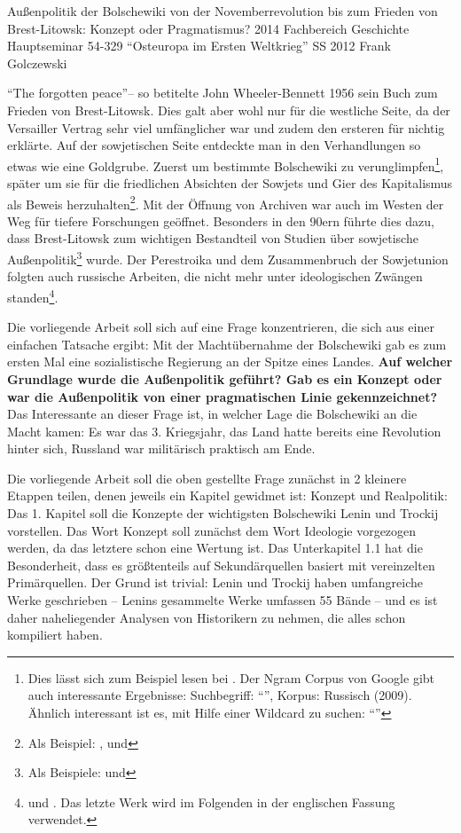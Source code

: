 \documentclass{../../sem_paper}
\begin{document}
\titlepg
{Außenpolitik der Bolschewiki von der Novemberrevolution bis zum Frieden von Brest-Litowsk: Konzept oder Pragmatismus?}
{2014}
{Fachbereich Geschichte}
{Hauptseminar 54-329 "`Osteuropa im Ersten Weltkrieg"'}
{SS 2012}
{Frank Golczewski}

\tocpaper

"`The forgotten peace"'-- so betitelte John Wheeler-Bennett 1956\autocite{wheeler1956} sein Buch zum Frieden von Brest-Litowsk. Dies galt aber wohl nur für die westliche Seite, da der Versailler Vertrag sehr viel umfänglicher war und zudem den ersteren für nichtig erklärte. Auf der sowjetischen Seite entdeckte man in den Verhandlungen so etwas wie eine Goldgrube. Zuerst um bestimmte Bolschewiki zu verunglimpfen\footnote{Dies lässt sich zum Beispiel lesen bei . Der Ngram Corpus von Google gibt auch interessante Ergebnisse: Suchbegriff: "`"', Korpus: Russisch (2009). Ähnlich interessant ist es, mit Hilfe einer Wildcard zu suchen: "`"'}, später um sie für die friedlichen Absichten der Sowjets und Gier des Kapitalismus als Beweis herzuhalten\footnote{Als Beispiel: ,  und }.
Mit der Öffnung von Archiven war auch im Westen der Weg für tiefere Forschungen geöffnet. Besonders in den 90ern führte dies dazu, dass Brest-Litowsk zum wichtigen Bestandteil von Studien über sowjetische Außenpolitik\footnote{Als Beispiele:  und } wurde. Der Perestroika und  dem Zusammenbruch der Sowjetunion folgten auch russische Arbeiten, die nicht mehr unter ideologischen Zwängen standen\footnote{ und  . Das letzte Werk wird im Folgenden in der englischen Fassung verwendet.}.
  

Die vorliegende Arbeit soll sich auf eine Frage konzentrieren, die sich aus einer einfachen Tatsache ergibt: Mit der Machtübernahme der Bolschewiki gab es zum ersten Mal eine sozialistische Regierung an der Spitze eines Landes. \textbf{Auf welcher Grundlage wurde die Außenpolitik geführt? Gab es ein Konzept oder war die Außenpolitik von einer pragmatischen Linie gekennzeichnet?}
Das Interessante an dieser Frage ist, in welcher Lage die Bolschewiki an die Macht kamen: Es war das 3. Kriegsjahr, das Land hatte bereits eine Revolution hinter sich, Russland war militärisch praktisch am Ende.

Die vorliegende Arbeit soll die oben gestellte Frage zunächst in 2 kleinere Etappen teilen, denen jeweils ein Kapitel gewidmet ist: Konzept und Realpolitik:
Das 1. Kapitel soll die Konzepte der wichtigsten Bolschewiki Lenin und Trockij vorstellen. Das Wort Konzept soll zunächst dem Wort Ideologie vorgezogen werden, da das letztere schon eine Wertung ist. Das Unterkapitel 1.1 hat die Besonderheit, dass es größtenteils auf Sekundärquellen basiert mit vereinzelten Primärquellen. Der Grund ist trivial: Lenin und Trockij haben umfangreiche Werke geschrieben -- Lenins gesammelte Werke umfassen 55 Bände -- und es ist daher naheliegender Analysen von Historikern zu nehmen, die alles schon kompiliert haben. 
\end{document}

